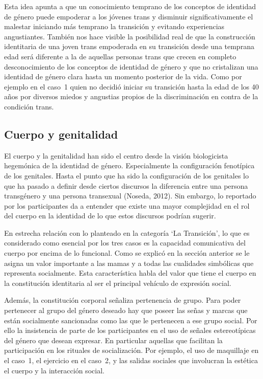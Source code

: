 Esta idea apunta a que un conocimiento temprano de los conceptos de identidad de
género puede empoderar a los jóvenes trans y disminuir significativamente el
malestar iniciando más temprano la transición y evitando experiencias
angustiantes. También nos hace visible la posibilidad real de que la
construcción identitaria de una joven trans empoderada en su transición desde
una temprana edad será diferente a la de aquellas personas trans que crecen en
completo desconocimiento de los conceptos de identidad de género y que no
cristalizan una identidad de género clara hasta un momento posterior de la vida.
Como por ejemplo en el caso~1 quien no decidió iniciar su transición hasta la
edad de los 40 años por diversos miedos y angustias propios de la discriminación
en contra de la condición trans.

\subsection{Cuerpo y genitalidad}

El cuerpo y la genitalidad han sido el centro desde la visión biologicista
hegemónica de la identidad de género. Especialmente la configuración fenotípica
de los genitales. Hasta el punto que ha sido la configuración de los genitales
lo que ha pasado a definir desde ciertos discursos la diferencia entre una
persona transgénero y una persona transexual (Noseda, 2012). Sin embargo, lo
reportado por los participantes da a entender que existe una mayor complejidad
en el rol del cuerpo en la identidad de lo que estos discursos podrían sugerir.

En estrecha relación con lo planteado en la categoría ‘La Transición’, lo que es
considerado como esencial por los tres casos es la capacidad comunicativa del
cuerpo por encima de lo funcional. Como se explicó en la sección anterior se le
asigna un valor importante a las mamas y a todas las cualidades simbólicas que
representa socialmente. Esta característica habla del valor que tiene el cuerpo
en la constitución identitaria al ser el principal vehículo de expresión social.

Además, la constitución corporal señaliza pertenencia de grupo. Para poder
pertenecer al grupo del género deseado hay que poseer las señas y marcas que
están socialmente sancionadas como las que le pertenecen a ese grupo social. Por
ello la insistencia de parte de los participantes en el uso de señales
estereotípicas del género que desean expresar. En particular aquellas que
facilitan la participación en los rituales de socialización. Por ejemplo, el uso
de maquillaje en el caso~1, el ejercicio en el caso~2, y las salidas sociales
que involucran la estética el cuerpo y la interacción social.


